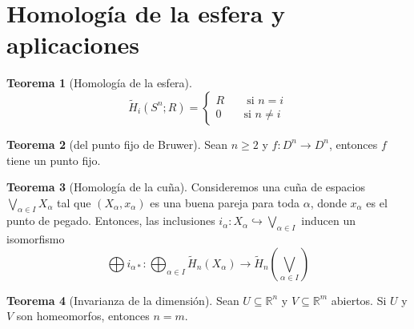 \documentclass[spanish]{book}
\theoremstyle{definition}
\newtheorem*{teo}{Teorema}
\newcommand{\R}{\mathbb{R}}
\begin{document}
\section{Homología de la esfera y aplicaciones}
	\begin{teo}[Homología de la esfera]
		\[\tilde H_i(S^n;R)=\begin{cases}R\qquad\text{si   } n=i\\
			0\qquad\text{si   } n\neq i
		\end{cases}\]
	\end{teo}
	\begin{teo}[del punto fijo de Bruwer]
		Sean $n\geq2$ y  $f:D^n\to D^n$, entonces $f$ tiene un punto fijo.
	\end{teo}
	\begin{teo}[Homología de la cuña]
		Consideremos una cuña de espacios $\bigvee_{\alpha\in I}X_\alpha$ tal que $(X_\alpha,x_\alpha)$ es una buena pareja para toda $\alpha$, donde $x_\alpha$ es el punto de pegado. Entonces, las inclusiones $i_\alpha:X_\alpha\hookrightarrow\bigvee_{\alpha\in I}$ inducen un isomorfismo
		\[\bigoplus i_{\alpha*}:\bigoplus_{\alpha\in I}\tilde{H}_n(X_\alpha)\to\tilde{H}_n(\bigvee_{\alpha\in I})\]
	\end{teo}
	\begin{teo}[Invarianza de la dimensión]
		Sean $U\subseteq\R^n$ y $V\subseteq\R^m$ abiertos. Si $U$ y $V$ son homeomorfos, entonces $n=m$.
	\end{teo}
\end{document}
